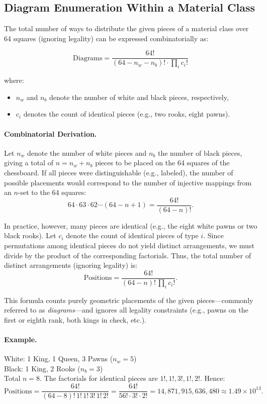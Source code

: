 \documentclass[12pt]{article}
\begin{document}
\subsection{Diagram Enumeration Within a Material Class}

The total number of ways to distribute the given pieces of a material class over 64 squares (ignoring legality) can be expressed combinatorially as:

\[
\text{Diagrams} = \frac{64!}{(64 - n_w - n_b)! \cdot \prod_i c_i!}
\]

where:
\begin{itemize}
\item $n_w$ and $n_b$ denote the number of white and black pieces, respectively,
\item $c_i$ denotes the count of identical pieces (e.g., two rooks, eight pawns).
\end{itemize}

\paragraph{Combinatorial Derivation.}
Let \(n_w\) denote the number of white pieces and \(n_b\) the number of black pieces, giving a total of \(n = n_w + n_b\) pieces to be placed on the 64 squares of the chessboard.  
If all pieces were distinguishable (e.g., labeled), the number of possible placements would correspond to the number of injective mappings from an \(n\)-set to the 64 squares:
\[
64 \cdot 63 \cdot 62 \cdots (64 - n + 1) = \frac{64!}{(64 - n)!}.
\]

In practice, however, many pieces are identical (e.g., the eight white pawns or two black rooks).  
Let \(c_i\) denote the count of identical pieces of type \(i\).  
Since permutations among identical pieces do not yield distinct arrangements, we must divide by the product of the corresponding factorials.  
Thus, the total number of distinct arrangements (ignoring legality) is:
\[
\text{Positions} = \frac{64!}{(64 - n)! \, \prod_i c_i!}.
\]

This formula counts purely geometric placements of the given pieces—commonly referred to as \emph{diagrams}—and ignores all legality constraints (e.g., pawns on the first or eighth rank, both kings in check, etc.).

\paragraph{Example.}
White: 1 King, 1 Queen, 3 Pawns (\(n_w = 5\)) \\
Black: 1 King, 2 Rooks (\(n_b = 3\)) \\
Total \(n = 8\).  
The factorials for identical pieces are \(1!, 1!, 3!, 1!, 2!\).  
Hence:
\[
\text{Positions} = \frac{64!}{(64 - 8)! \, 1! \, 1! \, 3! \, 1! \, 2!}
= \frac{64!}{56! \cdot 3! \cdot 2!}
= 14{,}871{,}915{,}636{,}480 \approx 1.49 \times 10^{13}.
\]
\end{document}
